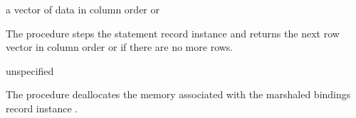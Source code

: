 \begin{procedure}
\end{procedure}
\returns{} a vector of data in column order or 

The  procedure steps the statement record instance
 and returns the next row vector in column order or
 if there are no more rows.

\begin{procedure}
\end{procedure}
\returns{} unspecified

The  procedure deallocates the memory
associated with the marshaled bindings record instance
.
